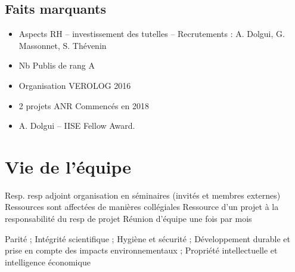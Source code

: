 	







  		
\subsection{Faits marquants}



\begin{itemize}
    \item Aspects RH -- investissement des tutelles --  Recrutements : A. Dolgui, G. Massonnet, S. Thévenin
    \item Nb Publis de rang A
    \item Organisation VEROLOG 2016
    \item 2 projets ANR Commencés en 2018
    \item A. Dolgui -- IISE Fellow Award.
\end{itemize}


\section{Vie de l'équipe}

	

Resp. resp adjoint
organisation en séminaires (invités et membres externes)
Ressources sont affectées de manières collégiales
Ressource d’un projet à la responsabilité du resp de projet
Réunion d’équipe une fois par mois 

Parité ; Intégrité scientifique ; Hygiène et sécurité ; Développement durable et prise en compte des  
impacts environnementaux ;  Propriété intellectuelle et intelligence économique
